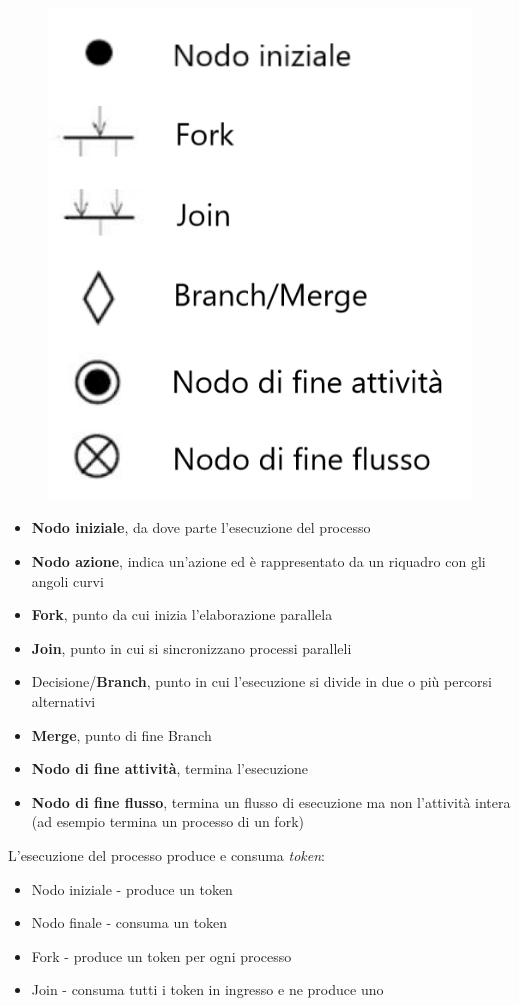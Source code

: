 \begin{figure}[H]
\centering
    \includegraphics[scale=0.3]{res/img/elementiDiagrammaAttivita}
\end{figure}
\begin{itemize}
\item \textbf{Nodo iniziale}, da dove parte l'esecuzione del processo
\item \textbf{Nodo azione}, indica un'azione ed è rappresentato da un riquadro con gli angoli curvi
\item \textbf{Fork}, punto da cui inizia l'elaborazione parallela
\item \textbf{Join}, punto in cui si sincronizzano processi paralleli
\item Decisione/\textbf{Branch}, punto in cui l'esecuzione si divide in due o più percorsi alternativi
\item \textbf{Merge}, punto di fine Branch
\item \textbf{Nodo di fine attività}, termina l'esecuzione
\item \textbf{Nodo di fine flusso}, termina un flusso di esecuzione ma non l'attività intera (ad esempio termina un processo di un fork)
\end{itemize}
L'esecuzione del processo produce e consuma \textit{token}:
\begin{itemize}
\item Nodo iniziale - produce un token
\item Nodo finale - consuma un token
\item Fork - produce un token per ogni processo
\item Join - consuma tutti i token in ingresso e ne produce uno
\end{itemize}

